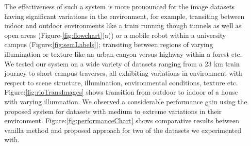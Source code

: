 \documentclass{article}
\begin{document}
The effectiveness of such a system is more pronounced for the image datasets having significant variations in the environment, for example, transiting between indoor and outdoor environments like a train running though tunnels as well as open areas (Figure-\ref{fig:flowchart}(a)) or a mobile robot within a university campus (Figure:\ref{fig:semLabels}); transiting between regions of varying illumination or texture like an urban canyon versus highway within a forest etc. We tested our system on a wide variety of datasets ranging from a 23 km train journey to short campus traverses, all exhibiting variations in environment with respect to scene structure, illumination, environmental conditions, texture etc. Figure:\ref{fig:rioTransImages} shows transition from outdoor to indoor of a house with varying illumnation. We observed a considerable performance gain using the proposed system for datasets with medium to extreme variations in their environment. Figure:\ref{fig:performanceChart} shows comparative results between vanilla method and proposed approach for two of the datasets we experimented with.

\newcommand{\imgW}{2.4cm}
\newcommand{\imgH}{1.4cm}
\end{document}
